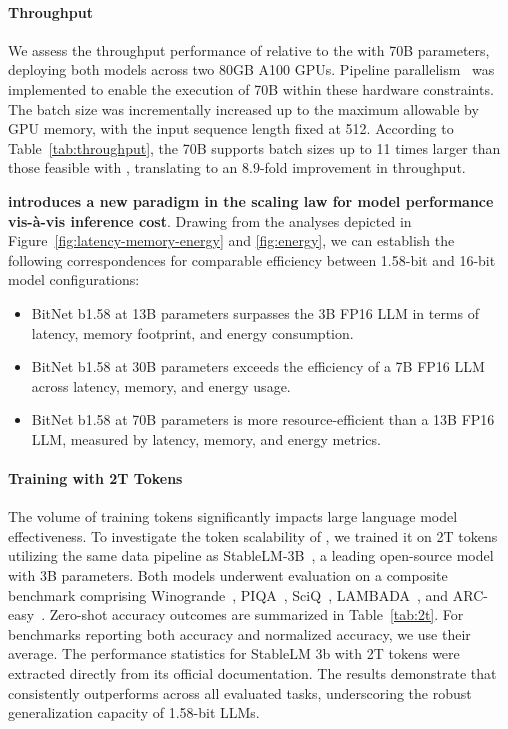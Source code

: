 \paragraph{Throughput}

We assess the throughput performance of  relative to the  with 70B parameters, deploying both models across two 80GB A100 GPUs. Pipeline parallelism~\cite{gpipe} was implemented to enable the execution of  70B within these hardware constraints. The batch size was incrementally increased up to the maximum allowable by GPU memory, with the input sequence length fixed at 512. According to Table~\ref{tab:throughput}, the 70B  supports batch sizes up to 11 times larger than those feasible with , translating to an 8.9-fold improvement in throughput.

\textbf{ introduces a new paradigm in the scaling law for model performance vis-à-vis inference cost}. Drawing from the analyses depicted in Figure~\ref{fig:latency-memory-energy} and \ref{fig:energy}, we can establish the following correspondences for comparable efficiency between 1.58-bit and 16-bit model configurations:

\begin{itemize}
    \item BitNet b1.58 at 13B parameters surpasses the 3B FP16 LLM in terms of latency, memory footprint, and energy consumption.
    \item BitNet b1.58 at 30B parameters exceeds the efficiency of a 7B FP16 LLM across latency, memory, and energy usage.
    \item BitNet b1.58 at 70B parameters is more resource-efficient than a 13B FP16 LLM, measured by latency, memory, and energy metrics.
\end{itemize}

\paragraph{Training with 2T Tokens}

The volume of training tokens significantly impacts large language model effectiveness. To investigate the token scalability of , we trained it on 2T tokens utilizing the same data pipeline as StableLM-3B~\cite{StableLM-3B-4E1T}, a leading open-source model with 3B parameters. Both models underwent evaluation on a composite benchmark comprising Winogrande~\cite{winoGrande}, PIQA~\cite{piqa}, SciQ~\cite{sciq}, LAMBADA~\cite{lambada}, and ARC-easy~\cite{arc}. Zero-shot accuracy outcomes are summarized in Table~\ref{tab:2t}. For benchmarks reporting both accuracy and normalized accuracy, we use their average. The performance statistics for StableLM 3b with 2T tokens were extracted directly from its official documentation. The results demonstrate that  consistently outperforms across all evaluated tasks, underscoring the robust generalization capacity of 1.58-bit LLMs.

